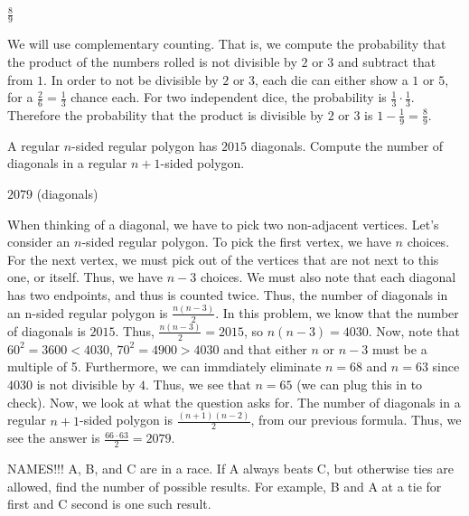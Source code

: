 \documentclass[11pt]{article}
\begin{document}
\begin{answer} %
$\boxed{\frac{8}{9}}$
\end{answer}

\begin{solution}
We will use complementary counting. That is, we compute the probability that the product of the numbers rolled is not divisible by $2$ or $3$ and subtract that from $1$. In order to not be divisible by $2$ or $3$, each die can either show a $1$ or $5$, for a $\frac{2}{6} = \frac{1}{3}$ chance each. For two independent dice, the probability is $\frac{1}{3} \cdot \frac{1}{3}$. Therefore the probability that the product is divisible by $2$ or $3$ is $1 - \frac{1}{9} = \boxed{\frac{8}{9}}$.
\end{solution}


\begin{problem}
A regular $n$-sided regular polygon has $2015$ diagonals. Compute the number of diagonals in a regular $n+1$-sided polygon.
\end{problem}

\begin{answer}
$\boxed{2079}$ (diagonals)
\end{answer}

\begin{solution}
When thinking of a diagonal, we have to pick two non-adjacent vertices. Let's consider an $n$-sided regular polygon. To pick the first vertex, we have $n$ choices. For the next vertex, we must pick out of the vertices that are not next to this one, or itself. Thus, we have $n-3$ choices. We must also note that each diagonal has two endpoints, and thus is counted twice. Thus, the number of diagonals in an n-sided regular polygon is $\frac{n(n-3)}{2}$. In this problem, we know that the number of diagonals is $2015$. Thus, $\frac{n(n-3)}{2} = 2015$, so $n(n-3) = 4030$. Now, note that $60^2 = 3600 < 4030$, $70^2 = 4900 > 4030$ and that either $n$ or $n-3$ must be a multiple of 5. Furthermore, we can immdiately eliminate $n = 68$ and $n = 63$ since $4030$ is not divisible by $4$. Thus, we see that $n = 65$ (we can plug this in to check). Now, we look at what the question asks for. The number of diagonals in a regular $n+1$-sided polygon is $\frac{(n+1)(n-2)}{2}$, from our previous formula. Thus, we see the answer is $\frac{66 \cdot 63}{2} = 2079$.
\end{solution}


\begin{problem}
NAMES!!! A, B, and C are in a race. If A always beats C, but otherwise ties are allowed, find the number of possible results. For example, B and A at a tie for first and C second is one such result.
\end{problem}
\end{document}
